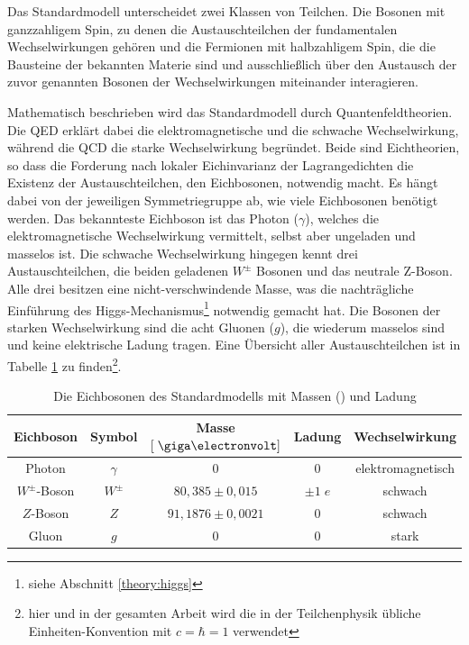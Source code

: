 Das Standardmodell unterscheidet zwei Klassen von Teilchen. Die Bosonen mit
ganzzahligem Spin, zu denen die Austauschteilchen der fundamentalen
Wechselwirkungen gehören und die Fermionen mit halbzahligem Spin, die die
Bausteine der bekannten Materie sind und ausschließlich über den Austausch der
zuvor genannten Bosonen der Wechselwirkungen miteinander interagieren.

Mathematisch beschrieben wird das Standardmodell durch Quantenfeldtheorien. Die
\ac{QED} erklärt dabei die elektromagnetische und die schwache Wechselwirkung,
während die \ac{QCD} die starke Wechselwirkung begründet. Beide sind
Eichtheorien, so dass die Forderung nach lokaler Eichinvarianz der
Lagrangedichten die Existenz der Austauschteilchen, den Eichbosonen, notwendig
macht. Es hängt dabei von der jeweiligen Symmetriegruppe ab, wie viele
Eichbosonen benötigt werden. Das bekannteste Eichboson ist das Photon
($\gamma$), welches die elektromagnetische Wechselwirkung vermittelt, selbst
aber ungeladen und masselos ist. Die schwache Wechselwirkung hingegen kennt
drei Austauschteilchen, die beiden geladenen $W^\pm$ Bosonen und das neutrale
Z-Boson. Alle drei besitzen eine nicht-verschwindende Masse, was die
nachträgliche Einführung des Higgs-Mechanismus\footnote{siehe Abschnitt
\ref{theory:higgs}} notwendig gemacht hat. Die Bosonen der starken
Wechselwirkung sind die acht Gluonen ($g$), die wiederum masselos sind und
keine elektrische Ladung tragen. Eine Übersicht aller Austauschteilchen ist in
Tabelle \ref{tab:bosons} zu finden\footnote{hier und in der gesamten Arbeit
wird die in der Teilchenphysik übliche Einheiten-Konvention mit $c=\hbar=1$
verwendet}.

\begin{table}[h]
    \centering
    \begin{tabular}{|c|c|c|c|c|}
        \hline
        \bf{Eichboson} & \bf{Symbol} & \bf{Masse} $[\GeV]$ & \bf{Ladung} &
        \bf{Wechselwirkung} \\
        \hline\hline
        Photon        & $\gamma$ & $0$         & $0$     & elektromagnetisch \\
        $W^\pm$-Boson & $W^\pm$  & $80,385 \pm 0,015$  & $\pm1\;e$ & schwach \\
        $Z$-Boson     & $Z$      & $91,1876 \pm 0,0021$& $0$       & schwach \\
        Gluon         & $g$      & $0$                 & $0$       & stark   \\
        \hline
    \end{tabular}
    \caption[Die Eichbosonen des Standardmodells]
        {Die Eichbosonen des Standardmodells mit Massen
        (\cite{PhysRevD.86.010001}) und Ladung}
    \label{tab:bosons}
\end{table}

